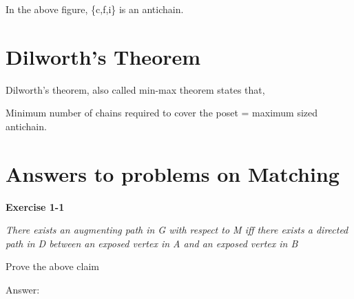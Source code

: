 \documentclass[twoside]{article}
\begin{document}
\begin{flushleft} In the above figure, \{c,f,i\} is an antichain.\end{flushleft}

\section{Dilworth's Theorem}

Dilworth's theorem, also called min-max theorem states that,
\begin{flushleft}
Minimum number of chains required to cover the poset = maximum sized antichain.  \end{flushleft}

\section{Answers to problems on Matching }
\begin{flushleft}\textbf{Exercise 1-1}\end{flushleft}
\begin{flushleft}
\textsl{There exists an augmenting path in G with respect to M iff there exists a directed path in D between an exposed vertex in A and an exposed vertex in B}
\end{flushleft}
\begin{flushleft} Prove the above claim\end{flushleft}
\begin{flushleft} Answer:\end{flushleft}
\end{document}
